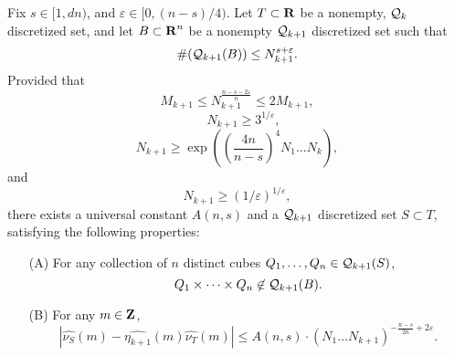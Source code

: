 \begin{lemma} \label{discreteFourierBuildingBlock}
    Fix $s \in [1,dn)$, and $\varepsilon \in [0,(n-s)/4)$. Let $T \subset \operatorname{\mathbf{R}}$ be a nonempty, $\operatorname{\mathcal{Q}}_k$ discretized set, and let $B \subset \operatorname{\mathbf{R}}^n$ be a nonempty $\operatorname{\mathcal{Q}}_{k+1}$ discretized set such that
    \begin{equation} \label{equation982589128942189}
    \begin{split}
        \#(\operatorname{\mathcal{Q}}_{k+1}(B)) \leq N_{k+1}^{s + \varepsilon}.
    \end{split}
    \end{equation}
    Provided that
    \begin{equation} \label{equation5523786128439}
        M_{k+1} \leq N_{k+1}^{\frac{n-s-2\varepsilon}{n}} \leq 2 M_{k+1},
    \end{equation}
    \begin{equation} \label{equation189248914891}
        \quad N_{k+1} \geq 3^{1/\varepsilon},
    \end{equation}
    \begin{equation} \label{equation8941894189238912}
        N_{k+1} \geq \exp \left( \left( \frac{4n}{n-s} \right)^4 N_1 \dots N_k \right),
    \end{equation}
    and
    \begin{equation} \label{equation77871247817841278}
        N_{k+1} \geq (1/\varepsilon)^{1/\varepsilon},
    \end{equation}
    there exists a universal constant $A(n,s)$ and a $\operatorname{\mathcal{Q}}_{k+1}$ discretized set $S \subset T$, satisfying the following properties:
    \begin{enumerate}
        \item[(A)] For any collection of $n$ distinct cubes $Q_1, \dots, Q_n \in \operatorname{\mathcal{Q}}_{k+1}(S)$,
        \[ Q_1 \times \dots \times Q_n \not \in \operatorname{\mathcal{Q}}_{k+1}(B). \]

        \item[(B)] For any $m \in \operatorname{\mathbf{Z}}$,
        \[ |\widehat{\nu_S}(m) - \widehat{\eta_{k+1}}(m) \widehat{\nu_T}(m)| \leq A(n,s) \cdot (N_1 \dots N_{k+1})^{-\frac{n - s}{2n} + 2\varepsilon}. \]
    \end{enumerate}
\end{lemma}
